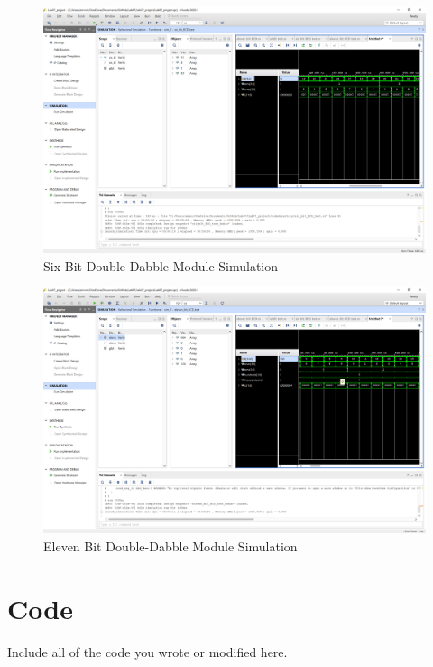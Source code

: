 \documentclass[11pt]{article}
\begin{document}
\begin{figure}[ht]\centering
	\includegraphics[width=1\textwidth,trim=19cm 15cm 0.5cm 4.5cm,clip]{six_BCD_test_screenshot}
	\caption{Six Bit Double-Dabble Module Simulation}
	\label{fig:sim_with_table}
\end{figure}

\begin{figure}[ht]\centering
	\includegraphics[width=1\textwidth,trim=19cm 15cm 0.5cm 4.5cm,clip]{elev_BCD_test_screenshot}
	\caption{Eleven Bit Double-Dabble Module Simulation}
	\label{fig:sim_with_table}
\end{figure}


\section*{Code}

Include all of the code you wrote or modified here.
\end{document}
